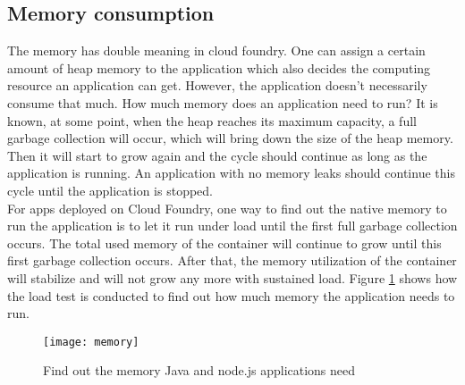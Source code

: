 \subsection{Memory consumption}
The memory has double meaning in cloud foundry. One can assign a certain amount of heap memory to the application which also decides the computing resource an application can get. However, the application doesn't necessarily consume that much. How much memory does an application need to run? It is known, at some point, when the heap reaches its maximum capacity, a full garbage collection will occur, which will bring down the size of the heap memory. Then it will start to grow again and the cycle should continue as long as the application is running. An application with no memory leaks should continue this cycle until the application is stopped. \\
For apps deployed on Cloud Foundry, one way to find out the native memory to run the application is to let it run under load until the first full garbage collection occurs. The total used memory of the container will continue to grow until this first garbage collection occurs. After that, the memory utilization of the container will stabilize and will not grow any more with sustained load. Figure \ref{memory} shows how the load test is conducted to find out how much memory the application needs to run. 

\begin{figure}[h]
	\centering
	\texttt{[image: memory]}
	\caption{Find out the memory Java and node.js applications need }
	\label{memory}
\end{figure}


